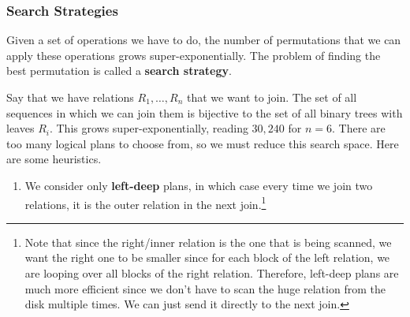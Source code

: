   \subsubsection{Search Strategies}  

    Given a set of operations we have to do, the number of permutations that we can apply these operations grows super-exponentially. The problem of finding the best permutation is called a \textbf{search strategy}. 

    \begin{example}
      Say that we have relations $R_1, \ldots, R_n$ that we want to join. The set of all sequences in which we can join them is bijective to the set of all binary trees with leaves $R_i$. This grows super-exponentially, reading $30,240$ for $n = 6$. There are too many logical plans to choose from, so we must reduce this search space. Here are some heuristics. 
      \begin{enumerate}
        \item We consider only \textbf{left-deep} plans, in which case every time we join two relations, it is the outer relation in the next join.\footnote{Note that since the right/inner relation is the one that is being scanned, we want the right one to be smaller since for each block of the left relation, we are looping over all blocks of the right relation. Therefore, left-deep plans are much more efficient since we don't have to scan the huge relation from the disk multiple times. We can just send it directly to the next join.} 

        \begin{figure}[H]
          \centering 
\end{figure}
\end{enumerate}
\end{example}
